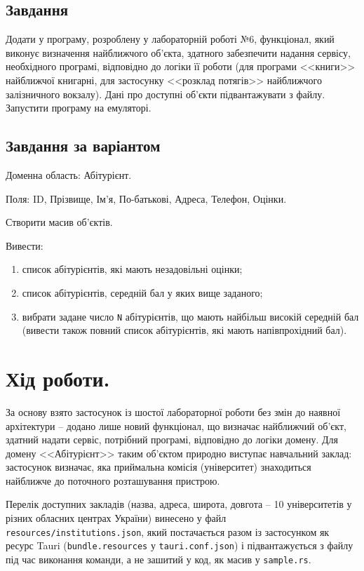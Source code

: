\documentclass[14pt, a4paper]{extreport}
\begin{document}
	\subsection*{Завдання}
	
	Додати у програму, розроблену у лабораторній роботі №6, функціонал, який виконує визначення найближчого об'єкта, здатного забезпечити надання сервісу, необхідного програмі, відповідно до логіки її роботи (для програми <<книги>> найближчої книгарні, для застосунку <<розклад потягів>> найближчого залізничного вокзалу). Дані про доступні об'єкти підвантажувати з файлу. Запустити програму на емуляторі.
	
	\subsection*{Завдання за варіантом}
	
	Доменна область: Абітурієнт. 
	
	Поля:  ID, Прізвище, Ім'я, По-батькові, Адреса, Телефон, Оцінки. 
	
	Створити масив об'єктів. 
	
	Вивести:
	
	\begin{enumerate}[label=\alph*.]
		\item список абітурієнтів, які мають незадовільні оцінки;
		
		\item список абітурієнтів, середній бал у яких вище заданого;
		
		\item вибрати задане число \texttt{N} абітурієнтів, що мають найбільш високій середній бал (вивести також повний список абітурієнтів, які мають напівпрохідний бал).
	\end{enumerate}
	
	\section*{Хід роботи.}

	За основу взято застосунок із шостої лабораторної роботи без змін до наявної архітектури -- додано лише новий функціонал, що визначає найближчий об'єкт, здатний надати сервіс, потрібний програмі, відповідно до логіки домену. Для домену <<Абітурієнт>> таким об'єктом природно виступає навчальний заклад: застосунок визначає, яка приймальна комісія (університет) знаходиться найближче до поточного розташування пристрою.
	
	Перелік доступних закладів (назва, адреса, широта, довгота -- 10 університетів у різних обласних центрах України) винесено у файл \texttt{resources/institutions.json}, який постачається разом із застосунком як ресурс Tauri (\texttt{bundle.resources} у \texttt{tauri.conf.json}) і підвантажується з файлу під час виконання команди, а не зашитий у код, як масив у \texttt{sample.rs}.
	
\end{document}
